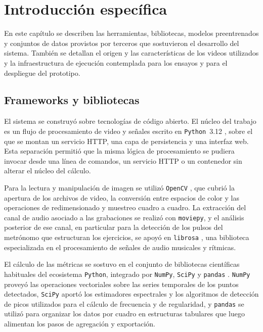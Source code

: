 
\chapter{Introducción específica} %

\label{Chapter2}

En este capítulo se describen las herramientas, bibliotecas, modelos preentrenados y conjuntos de datos provistos por terceros que sostuvieron el desarrollo del sistema. También se detallan el origen y las características de los videos utilizados y la infraestructura de ejecución contemplada para los ensayos y para el despliegue del prototipo.


\section{Frameworks y bibliotecas}
\label{sec:frameworks}

El sistema se construyó sobre tecnologías de código abierto. El núcleo del trabajo es un flujo de procesamiento de video y señales escrito en \texttt{Python}~3.12 \citep{python3}, sobre el que se montan un servicio HTTP, una capa de persistencia y una interfaz web. Esta separación permitió que la misma lógica de procesamiento se pudiera invocar desde una línea de comandos, un servicio HTTP o un contenedor sin alterar el núcleo del cálculo.

Para la lectura y manipulación de imagen se utilizó \texttt{OpenCV} \citep{bradski2000opencv}, que cubrió la apertura de los archivos de video, la conversión entre espacios de color y las operaciones de redimensionado y muestreo cuadro a cuadro. La extracción del canal de audio asociado a las grabaciones se realizó con \texttt{moviepy}, y el análisis posterior de ese canal, en particular para la detección de los pulsos del metrónomo que estructuran los ejercicios, se apoyó en \texttt{librosa} \citep{mcfee2015librosa}, una biblioteca especializada en el procesamiento de señales de audio musicales y rítmicas.

El cálculo de las métricas se sostuvo en el conjunto de bibliotecas científicas habituales del ecosistema \texttt{Python}, integrado por \texttt{NumPy}, \texttt{SciPy} y \texttt{pandas} \citep{virtanen2020scipy}. \texttt{NumPy} proveyó las operaciones vectoriales sobre las series temporales de los puntos detectados, \texttt{SciPy} aportó los estimadores espectrales y los algoritmos de detección de picos utilizados para el cálculo de frecuencia y de regularidad, y \texttt{pandas} se utilizó para organizar los datos por cuadro en estructuras tabulares que luego alimentan los pasos de agregación y exportación.

